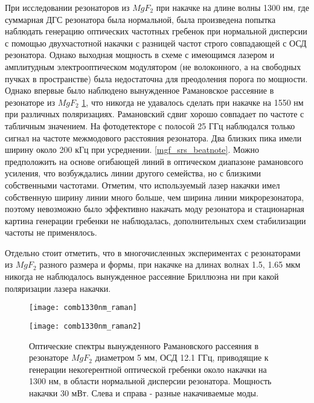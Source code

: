 При исследовании резонаторов из $MgF_2$ при накачке на длине волны 1300 нм, где суммарная ДГС резонатора была нормальной, была произведена попытка наблюдать генерацию оптических частотных гребенок при нормальной дисперсии с помощью двухчастотной накачки с разницей частот строго совпадающей с ОСД резонатора. Однако выходная мощность в схеме с имеющимся лазером и амплитудным электрооптическом модулятором (не волоконного, а на свободных пучках в пространстве) была недостаточна для преодоления порога по мощности. Однако впервые было наблюдено вынужденное Рамановское рассеяние в резонаторе из $MgF_2$ \ref{mgf_srs}, что никогда не удавалось сделать при накачке на 1550 нм при различных поляризациях. Рамановский сдвиг хорошо совпадает по частоте с табличным значением. На фотодетекторе с полосой 25 ГГц наблюдался только сигнал на частоте межмодового расстояния резонатора. Два близких пика имели ширину около 200 кГц при усреднении. \ref{mgf_srs_beatnote}. Можно предположить на основе огибающей линий в оптическом диапазоне рамановсого усиления, что возбуждались линии другого семейства, но с близкими собственными частотами. Отметим, что используемый лазер накачки имел собственную ширину линии много больше, чем ширина линии микрорезонатора, поэтому невозможно было эффективно накачать моду резонатора и стационарная картина генерации гребенки не наблюдалась, дополнительных схем стабилизации частоты не применялось.

Отдельно стоит отметить, что в многочисленных экспериментах с резонаторами из $MgF_2$ разного размера и формы, при накачке на длинах волнах 1.5, 1.65 мкм никогда не наблюдалось вынужденное рассеяние Бриллюэна ни при какой поляризации лазера накачки.

\begin{figure}[ht]
\begin{minipage}[ht]{0.49\linewidth}\centering
    \texttt{[image: comb1330nm\_raman]}
  \end{minipage}
  \hfill
  \begin{minipage}[ht]{0.49\linewidth}\centering
    \texttt{[image: comb1330nm\_raman2]}
  \end{minipage}
    \caption{Оптические спектры вынужденного Рамановского рассеяния в резонаторе $MgF_2$ диаметром 5 мм, ОСД 12.1 ГГц, приводящие к генерации некогерентной оптической гребенки около накачки на 1300 нм, в области нормальной дисперсии резонатора. Мощность накачки 30 мВт. Слева и справа - разные накачиваемые моды.}
  \label{mgf_srs}
\end{figure}

